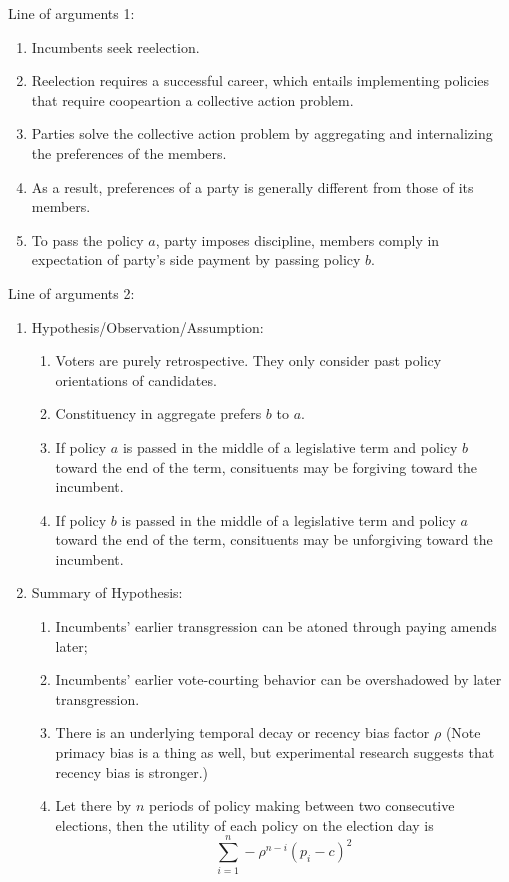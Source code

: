 \documentclass[hyphens, crop=false]{standalone}
\begin{document}
	Line of arguments 1:
	\begin{enumerate}
		\item 
		Incumbents seek reelection.
		\item 
		Reelection requires
		a successful career,
		which entails implementing policies that require coopeartion
		a collective action problem.
		\item 
		Parties solve the collective action problem
		by aggregating and internalizing the preferences of the members.
		\item 
		As a result, preferences of a party is generally different from those of its members.
		\item 
		To pass the policy $a$, party imposes discipline, members comply in expectation of party's side payment by passing policy $b$.
	\end{enumerate}
	Line of arguments 2:
	\begin{enumerate}
		\item 
		Hypothesis/Observation/Assumption:
		\begin{enumerate}
			\item 
			Voters are purely retrospective. They only consider past policy orientations of candidates.
			\item 
			Constituency in aggregate prefers $b$ to $a$.
			\item 
			If policy $a$ is passed in the middle of a legislative term and policy $b$ toward the end of the term,
			consituents may be forgiving toward the incumbent.
			\item 
			If policy $b$ is passed in the middle of a legislative term and policy $a$ toward the end of the term,
			consituents may be unforgiving toward the incumbent.
		\end{enumerate}
		\item 
		Summary of Hypothesis:
		\begin{enumerate}
			\item 
			Incumbents' earlier transgression can be atoned through paying amends later;
			\item 
			Incumbents' earlier vote-courting behavior can be overshadowed by later transgression.
			\item 
			There is an underlying temporal decay or recency bias factor $\rho$
			(Note primacy bias is a thing as well, but experimental research suggests that recency bias is stronger.)
			\item 
			Let there by $n$ periods of policy making between two consecutive elections, then the utility of each policy on the election day is
			$$
			\sum_{i = 1}^{n} -\rho^{n-i}( p_i-c)^2
			$$
		\end{enumerate}
	\end{enumerate}
\end{document}
